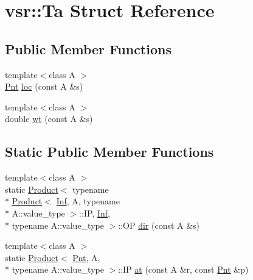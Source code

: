 \hypertarget{structvsr_1_1_ta}{\section{vsr\-:\-:Ta Struct Reference}
\label{structvsr_1_1_ta}
}
\subsection*{Public Member Functions}
\begin{DoxyCompactItemize}
\item 
{\footnotesize template$<$class A $>$ }\\\hyperlink{namespacevsr_a2d05beb9721c5d9211b479af6d47222d}{Pnt} \hyperlink{structvsr_1_1_ta_abe584193f1ac7b2655ac5c9a661a53bb}{loc} (const A \&s)
\item 
{\footnotesize template$<$class A $>$ }\\double \hyperlink{structvsr_1_1_ta_a0bba724f4e9d306f1de44e205d95a2f1}{wt} (const A \&s)
\end{DoxyCompactItemize}
\subsection*{Static Public Member Functions}
\begin{DoxyCompactItemize}
\item 
{\footnotesize template$<$class A $>$ }\\static \hyperlink{structvsr_1_1_product}{Product}$<$ typename \\*
\hyperlink{structvsr_1_1_product}{Product}$<$ \hyperlink{namespacevsr_ada8b0256ac30adae62e72c0309b72567}{Inf}, A, typename \\*
A\-::value\-\_\-type $>$\-::I\-P, \hyperlink{namespacevsr_ada8b0256ac30adae62e72c0309b72567}{Inf}, \\*
typename A\-::value\-\_\-type $>$\-::O\-P \hyperlink{structvsr_1_1_ta_a898b180e2d64d6d3b8c13ae2498f5834}{dir} (const A \&s)
\item 
{\footnotesize template$<$class A $>$ }\\static \hyperlink{structvsr_1_1_product}{Product}$<$ \hyperlink{namespacevsr_a2d05beb9721c5d9211b479af6d47222d}{Pnt}, A, \\*
typename A\-::value\-\_\-type $>$\-::I\-P \hyperlink{structvsr_1_1_ta_a7a16b4a81a5583241fe2305fd1b8a487}{at} (const A \&r, const \hyperlink{namespacevsr_a2d05beb9721c5d9211b479af6d47222d}{Pnt} \&p)
\end{DoxyCompactItemize}



